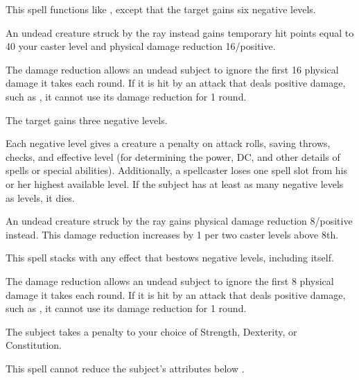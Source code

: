 \begin{spelleffect}
  This spell functions like , except that the target gains six negative levels.
  \par An undead creature struck by the ray instead gains temporary hit points equal to 40 \add your caster level and physical damage reduction 16/positive. 
\end{spelleffect}
\begin{spellnotes}
  The damage reduction allows an undead subject to ignore the first 16 physical damage it takes each round. If it is hit by an attack that deals positive damage, such as , it cannot use its damage reduction for 1 round.
\end{spellnotes}

\spellrng{\rngclose}
\spelldur{\durlong}
\begin{spelleffect}
  The target gains three negative levels.
  \par Each negative level gives a creature a  penalty on attack rolls, saving throws, checks, and effective level (for determining the power, DC, and other details of spells or special abilities). Additionally, a spellcaster loses one spell slot from his or her highest available level. If the subject has at least as many negative levels as levels, it dies.
  \par An undead creature struck by the ray gains physical damage reduction 8/positive instead. This damage reduction increases by 1 per two caster levels above 8th.
\end{spelleffect}
\begin{spellnotes}
  This spell stacks with any effect that bestows negative levels, including itself.

  The damage reduction allows an undead subject to ignore the first 8 physical damage it takes each round. If it is hit by an attack that deals positive damage, such as , it cannot use its damage reduction for 1 round.
\end{spellnotes}

\spellrng{\rngmed}
\spelldur{\durshort}
\begin{spelleffect}
  The subject takes a  penalty to your choice of Strength, Dexterity, or Constitution.
\end{spelleffect}
\begin{spellnotes}
  This spell cannot reduce the subject's attributes below .
\end{spellnotes}

